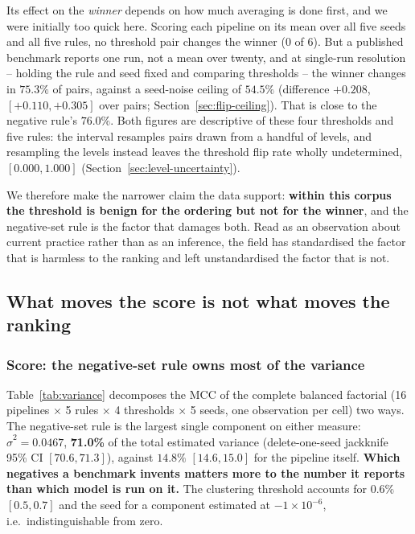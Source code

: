 \documentclass[11pt,a4paper]{article}
\begin{document}
Its effect on the \emph{winner} depends on how much averaging is done first, and we were
initially too quick here. Scoring each pipeline on its mean over all five seeds and all
five rules, no threshold pair changes the winner ($0$ of $6$). But a published benchmark
reports one run, not a mean over twenty, and at single-run resolution -- holding the rule
and seed fixed and comparing thresholds -- the winner changes in $75.3\%$ of pairs, against
a seed-noise ceiling of $54.5\%$ (difference ${+}0.208$, $[{+}0.110, {+}0.305]$ over pairs;
Section~\ref{sec:flip-ceiling}). That is close to the negative rule's $76.0\%$. Both
figures are descriptive of these four thresholds and five rules: the interval resamples
pairs drawn from a handful of levels, and resampling the levels instead leaves the
threshold flip rate wholly undetermined, $[0.000, 1.000]$
(Section~\ref{sec:level-uncertainty}).

We therefore make the narrower claim the data support: \textbf{within this corpus the
threshold is benign for the ordering but not for the winner}, and the negative-set rule is
the factor that damages both. Read as an observation about current practice rather than as
an inference, the field has standardised the factor that is harmless to the ranking and
left unstandardised the factor that is not.

\subsection{What moves the score is not what moves the ranking}

\subsubsection*{Score: the negative-set rule owns most of the variance}

Table~\ref{tab:variance} decomposes the MCC of the complete balanced factorial
(16 pipelines $\times$ 5 rules $\times$ 4 thresholds $\times$ 5 seeds, one observation per
cell) two ways. The negative-set rule is the largest single component on either measure:
$\hat\sigma^2 = 0.0467$, \textbf{71.0\%} of the total estimated variance
(delete-one-seed jackknife 95\% CI $[70.6, 71.3]$), against $14.8\%$ $[14.6, 15.0]$ for the
pipeline itself. \textbf{Which negatives a benchmark invents matters more to the number it
reports than which model is run on it.} The clustering threshold accounts for $0.6\%$
$[0.5, 0.7]$ and the seed for a component estimated at $-1\times10^{-6}$, i.e.\
indistinguishable from zero.
\end{document}

